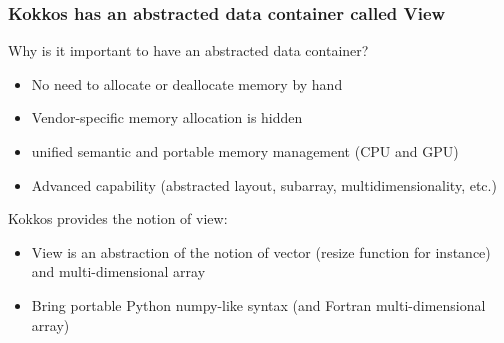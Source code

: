 \documentclass[aspectratio=169]{beamer}
\begin{document}
\begin{frame}[fragile]
    \frametitle{Kokkos has an abstracted data container called View} 

Why is it important to have an abstracted data container?

\begin{itemize}
    \item No need to allocate or deallocate memory by hand
    \item Vendor-specific memory allocation is hidden
    \item unified semantic and portable memory management (CPU and GPU)
    \item Advanced capability (abstracted layout, subarray, multidimensionality, etc.)
\end{itemize}

Kokkos provides the notion of view:

\begin{itemize}
    \item View is an abstraction of the notion of vector (resize function for instance) and multi-dimensional array
    \item Bring portable Python numpy-like syntax (and Fortran multi-dimensional array)
\end{itemize}

\end{frame}

\end{document}
